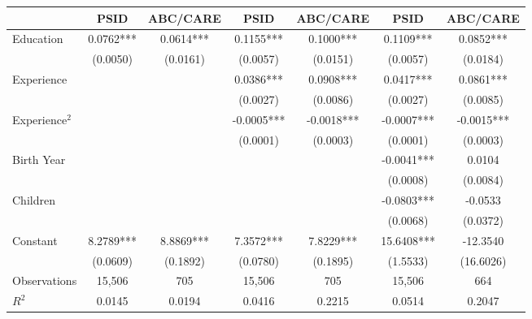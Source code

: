\begin{tabular}{lcccccc} \toprule
 & PSID & ABC/CARE & PSID & ABC/CARE & PSID & ABC/CARE \\ \midrule
Education & 0.0762*** & 0.0614*** & 0.1155*** & 0.1000*** & 0.1109*** & 0.0852*** \\
 & (0.0050) & (0.0161) & (0.0057) & (0.0151) & (0.0057) & (0.0184) \\
Experience &  &  & 0.0386*** & 0.0908*** & 0.0417*** & 0.0861*** \\
 &  &  & (0.0027) & (0.0086) & (0.0027) & (0.0085) \\
Experience$^2$ &  &  & -0.0005*** & -0.0018*** & -0.0007*** & -0.0015*** \\
 &  &  & (0.0001) & (0.0003) & (0.0001) & (0.0003) \\
Birth Year &  &  &  &  & -0.0041*** & 0.0104 \\
 &  &  &  &  & (0.0008) & (0.0084) \\
Children &  &  &  &  & -0.0803*** & -0.0533 \\
 &  &  &  &  & (0.0068) & (0.0372) \\
Constant & 8.2789*** & 8.8869*** & 7.3572*** & 7.8229*** & 15.6408*** & -12.3540 \\
 & (0.0609) & (0.1892) & (0.0780) & (0.1895) & (1.5533) & (16.6026) \\ \midrule
Observations & 15,506 & 705 & 15,506 & 705 & 15,506 & 664 \\
$R^2$ & 0.0145 & 0.0194 & 0.0416 & 0.2215 & 0.0514 & 0.2047 \\ \bottomrule
\end{tabular}
